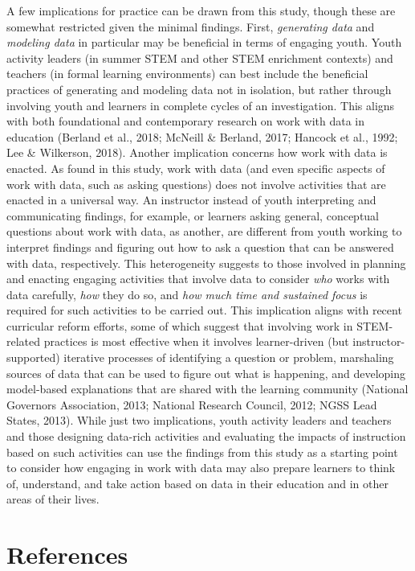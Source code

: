\documentclass[]{msu-thesis}
\theoremstyle{definition}
\theoremstyle{definition}
\theoremstyle{definition}
\theoremstyle{remark}
\begin{document}
A few implications for practice can be drawn from this study, though
these are somewhat restricted given the minimal findings. First,
\emph{generating data} and \emph{modeling data} in particular may be
beneficial in terms of engaging youth. Youth activity leaders (in summer
STEM and other STEM enrichment contexts) and teachers (in formal
learning environments) can best include the beneficial practices of
generating and modeling data not in isolation, but rather through
involving youth and learners in complete cycles of an investigation.
This aligns with both foundational and contemporary research on work
with data in education (Berland et al., 2018; McNeill \& Berland, 2017;
Hancock et al., 1992; Lee \& Wilkerson, 2018). Another implication
concerns how work with data is enacted. As found in this study, work
with data (and even specific aspects of work with data, such as asking
questions) does not involve activities that are enacted in a universal
way. An instructor instead of youth interpreting and communicating
findings, for example, or learners asking general, conceptual questions
about work with data, as another, are different from youth working to
interpret findings and figuring out how to ask a question that can be
answered with data, respectively. This heterogeneity suggests to those
involved in planning and enacting engaging activities that involve data
to consider \emph{who} works with data carefully, \emph{how} they do so,
and \emph{how much time and sustained focus} is required for such
activities to be carried out. This implication aligns with recent
curricular reform efforts, some of which suggest that involving work in
STEM-related practices is most effective when it involves learner-driven
(but instructor-supported) iterative processes of identifying a question
or problem, marshaling sources of data that can be used to figure out
what is happening, and developing model-based explanations that are
shared with the learning community (National Governors Association,
2013; National Research Council, 2012; NGSS Lead States, 2013). While
just two implications, youth activity leaders and teachers and those
designing data-rich activities and evaluating the impacts of instruction
based on such activities can use the findings from this study as a
starting point to consider how engaging in work with data may also
prepare learners to think of, understand, and take action based on data
in their education and in other areas of their lives.

\chapter{References}\label{references}
\end{document}
